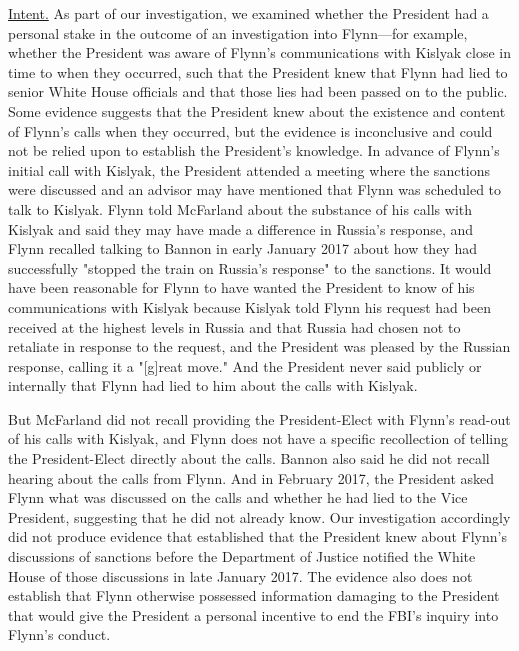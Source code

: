 \underline{Intent.}
As part of our investigation, we examined whether the President had a personal stake in the outcome of an investigation into Flynn---for example, whether the President was aware of Flynn's communications with Kislyak close in time to when they occurred, such that the President knew that Flynn had lied to senior White House officials and that those lies had been passed on to the public.
Some evidence suggests that the President knew about the existence and content of Flynn's calls when they occurred, but the evidence is inconclusive and could not be relied upon to establish the President's knowledge.
In advance of Flynn's initial call with Kislyak, the President attended a meeting where the sanctions were discussed and an advisor may have mentioned that Flynn was scheduled to talk to Kislyak.
Flynn told McFarland about the substance of his calls with Kislyak and said they may have made a difference in Russia's response, and Flynn recalled talking to Bannon in early January 2017 about how they had successfully "stopped the train on Russia's response" to the sanctions.
It would have been reasonable for Flynn to have wanted the President to know of his communications with Kislyak because Kislyak told Flynn his request had been received at the highest levels in Russia and that Russia had chosen not to retaliate in response to the request, and the President was pleased by the Russian response, calling it a "[g]reat move."
And the President never said publicly or internally that Flynn had lied to him about the calls with Kislyak.

But McFarland did not recall providing the President-Elect with Flynn's read-out of his calls with Kislyak, and Flynn does not have a specific recollection of telling the President-Elect directly about the calls.
Bannon also said he did not recall hearing about the calls from Flynn.
And in February 2017, the President asked Flynn what was discussed on the calls and whether he had lied to the Vice President, suggesting that he did not already know.
Our investigation accordingly did not produce evidence that established that the President knew about Flynn's discussions of sanctions before the Department of Justice notified the White House of those discussions in late January 2017.
The evidence also does not establish that Flynn otherwise possessed information damaging to the President that would give the President a personal incentive to end the FBI's inquiry into Flynn's conduct.

